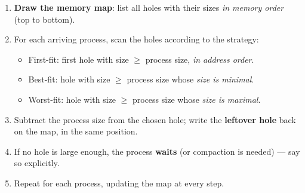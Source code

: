 \documentclass[11pt]{article}
\begin{document}
\begin{methode}
\begin{enumerate}
\item \textbf{Draw the memory map}: list all holes with their sizes \emph{in memory order} (top to bottom).
\item For each arriving process, scan the holes according to the strategy:
\begin{itemize}
\item First-fit: first hole with size $\geq$ process size, \emph{in address order}.
\item Best-fit: hole with size $\geq$ process size whose \emph{size is minimal}.
\item Worst-fit: hole with size $\geq$ process size whose \emph{size is maximal}.
\end{itemize}
\item Subtract the process size from the chosen hole; write the \textbf{leftover hole} back on the map, in the same position.
\item If no hole is large enough, the process \textbf{waits} (or compaction is needed) — say so explicitly.
\item Repeat for each process, updating the map at every step.
\end{enumerate}
\end{methode}
\end{document}
